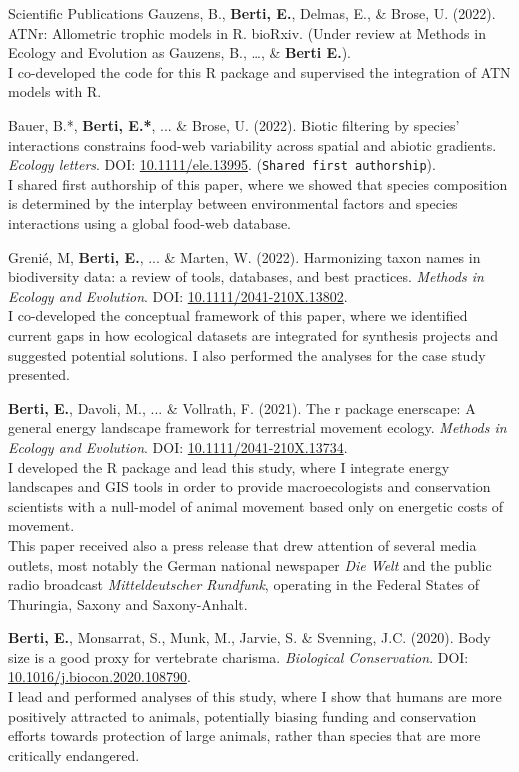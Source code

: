 \documentclass{resume} %
\begin{document}
\begin{rSection}{Scientific Publications}
Gauzens, B., \textbf{Berti, E.}, Delmas, E., \& Brose, U. (2022). ATNr: Allometric trophic models in R. bioRxiv. (Under review at Methods in Ecology and Evolution as Gauzens, B., \dots, \& \textbf{Berti E.}).\\
I co-developed the code for this R package and supervised the integration of ATN models with R.

Bauer, B.*, \textbf{Berti, E.*}, ... \& Brose, U. (2022). Biotic filtering by species’ interactions constrains food-web variability across spatial and abiotic gradients. \textit{Ecology letters}. DOI: \href{https://doi.org/10.1111/ele.13995}{10.1111/ele.13995}. (\texttt{Shared first authorship}).\\
I shared first authorship of this paper, where we showed that species composition is determined by the interplay between environmental factors and species interactions using a global food-web database.

Grenié, M, \textbf{Berti, E.}, ... \& Marten, W. (2022). Harmonizing taxon names in biodiversity data: a review of tools, databases, and best practices. \textit{Methods in Ecology and Evolution}. DOI: \href{https://doi.org/10.1111/2041-210X.13802}{10.1111/2041-210X.13802}.\\
I co-developed the conceptual framework of this paper, where we identified current gaps in how ecological datasets are integrated for synthesis projects and suggested potential solutions. I also performed the analyses for the case study presented.

\textbf{Berti, E.}, Davoli, M., ... \& Vollrath, F. (2021). The r package enerscape: A general energy landscape framework for terrestrial movement ecology. \textit{Methods in Ecology and Evolution}. DOI: \href{https://doi.org/10.1111/2041-210X.13734}{10.1111/2041-210X.13734}.\\
I developed the R package and lead this study, where I integrate energy landscapes and GIS tools in order to provide macroecologists and conservation scientists with a null-model of animal movement based only on energetic costs of movement.\\
This paper received also a press release that drew attention of several media outlets, most notably the German national newspaper \textit{Die Welt} and the public radio broadcast \textit{Mitteldeutscher Rundfunk}, operating in the Federal States of Thuringia, Saxony and Saxony-Anhalt.

\clearpage

\textbf{Berti, E.}, Monsarrat, S., Munk, M., Jarvie, S. \& Svenning, J.C. (2020). Body size is a good proxy for vertebrate charisma. \textit{Biological Conservation}. DOI: \href{https://doi.org/10.1016/j.biocon.2020.108790}{10.1016/j.biocon.2020.108790}.\\
I lead and performed analyses of this study, where I show that humans are more positively attracted to animals, potentially biasing funding and conservation efforts towards protection of large animals, rather than species that are more critically endangered.


\end{rSection}
\end{document}
